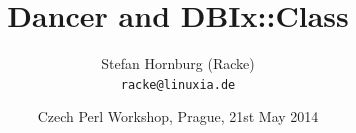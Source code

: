 \usepackage[utf8]{inputenc}
\usepackage[T1]{fontenc}
\usepackage{mathptmx}
\usepackage[scaled=.90]{helvet}
\usepackage{courier}
\usepackage{caption}
\captionsetup{labelformat=empty,labelsep=none}
\usepackage{verbatim}
\usepackage{hyperref}
\usepackage{listings}
\usepackage{ulem}
\lstset{language=Perl,basicstyle=\normalsize,tabsize=3,showstringspaces=false}

\title{Dancer and DBIx::Class}
\author[racke]{Stefan Hornburg (Racke)\\ \texttt{racke@linuxia.de}}
\date{Czech Perl Workshop, Prague, 21st May 2014}


\maketitle{}

\begin{frame}
  \titlepage
\end{frame}

\tableofcontents








